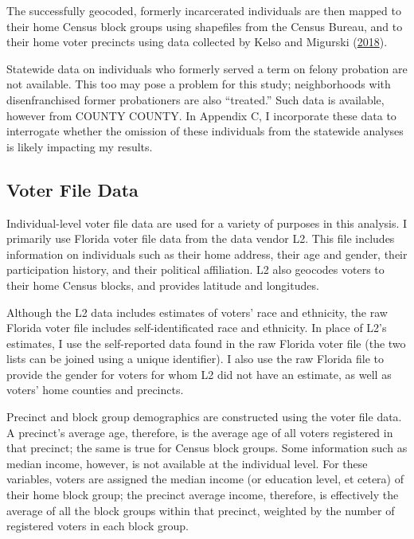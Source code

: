 \documentclass[
  12pt,
]{article}
\begin{document}
The successfully geocoded, formerly incarcerated individuals are then mapped to their home Census block groups using shapefiles from the Census Bureau, and to their home voter precincts using data collected by Kelso and Migurski (\protect\hyperlink{ref-Kelso2018}{2018}).

Statewide data on individuals who formerly served a term on felony probation are not available. This too may pose a problem for this study; neighborhoods with disenfranchised former probationers are also ``treated.'' Such data is available, however from COUNTY COUNTY. In Appendix C, I incorporate these data to interrogate whether the omission of these individuals from the statewide analyses is likely impacting my results.

\hypertarget{voter-file-data}{%
\subsection*{Voter File Data}\label{voter-file-data}}

Individual-level voter file data are used for a variety of purposes in this analysis. I primarily use Florida voter file data from the data vendor L2. This file includes information on individuals such as their home address, their age and gender, their participation history, and their political affiliation. L2 also geocodes voters to their home Census blocks, and provides latitude and longitudes.

Although the L2 data includes estimates of voters' race and ethnicity, the raw Florida voter file includes self-identificated race and ethnicity. In place of L2's estimates, I use the self-reported data found in the raw Florida voter file (the two lists can be joined using a unique identifier). I also use the raw Florida file to provide the gender for voters for whom L2 did not have an estimate, as well as voters' home counties and precincts.

Precinct and block group demographics are constructed using the voter file data. A precinct's average age, therefore, is the average age of all voters registered in that precinct; the same is true for Census block groups. Some information such as median income, however, is not available at the individual level. For these variables, voters are assigned the median income (or education level, et cetera) of their home block group; the precinct average income, therefore, is effectively the average of all the block groups within that precinct, weighted by the number of registered voters in each block group.
\end{document}
